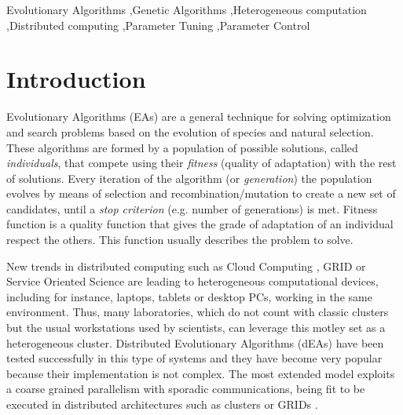 \documentclass[final,1p,times]{elsarticle}
\begin{document}
\begin{frontmatter}
\begin{abstract}
\end{abstract}

\begin{keyword}
Evolutionary Algorithms \sep Genetic Algorithms \sep Heterogeneous computation \sep Distributed computing \sep Parameter Tuning \sep Parameter Control
\end{keyword}

\end{frontmatter}

\section{Introduction}
\label{sec:intro}


Evolutionary Algorithms (EAs) are a general technique for solving optimization and search problems based on the evolution of species and natural selection. These algorithms are formed by a population of possible solutions, called {\em individuals}, that compete using their {\em fitness} (quality of adaptation) with the rest of solutions. Every iteration of the algorithm (or {\em generation}) the population evolves by means of selection and recombination/mutation to create a new set of candidates, until a {\em stop criterion} (e.g. number of generations) is met. Fitness function is a quality function that gives the grade of adaptation of an individual respect the others. This function usually describes the problem to solve.

New trends in distributed computing such as Cloud Computing \cite{CLOUD}, GRID
\cite{OPENSCIENCEGRID} or Service Oriented Science \cite{GLOBUS} are
leading to heterogeneous computational devices, including for instance, laptops,
tablets or desktop PCs, working in the same
environment. Thus, many laboratories, which do not count with classic
clusters but the usual workstations used by scientists, can leverage
this motley set as a heterogeneous cluster. Distributed Evolutionary
Algorithms (dEAs) \cite{MULTIKULTI,PARALLELGRIDHETEROGENEOUS} have been tested successfully in this
type of systems \cite{HETEROGENEOUSHARD} and they have become very popular because their implementation is
not complex.  %
The most extended model exploits a coarse grained parallelism with sporadic %
 communications, being fit to be executed in distributed architectures
 such as clusters or GRIDs \cite{PLATO}.%
\end{document}
